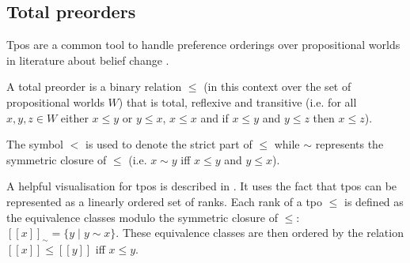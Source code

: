 \documentclass[english, 12pt]{scrartcl}
\theoremstyle{definition}
\theoremstyle{definition}
\theoremstyle{definition}
\begin{document}
\subsection{Total preorders}
Tpos are a common tool to handle preference orderings over propositional worlds in literature about belief change \cite{Booth2011}.

A total preorder is a binary relation $\leq$ (in this context over the set of propositional worlds $W$) that is total, reflexive and transitive (i.e. for all $x, y, z \in W$ either $x \leq y$ or $y \leq x$, $x \leq x$ and if $x \leq y$ and $y \leq z$ then $x \leq z$).

The symbol $<$ is used to denote the strict part of $\leq$ while $\sim$ represents the symmetric closure of $\leq$ (i.e. $x \sim y$ iff $x \leq y$ and $y \leq x$).

A helpful visualisation for tpos is described in \cite{Booth2006}. It uses the fact that tpos can be represented as a linearly ordered set of ranks. Each rank of a tpo $\leq$ is defined as the equivalence classes modulo the symmetric closure of $\leq$: $[[x]]_{\sim} = \{y \mid y \sim x\}$. These equivalence classes are then ordered by the relation $[[x]] \leq [[y]]$ iff $x \leq y$.
\end{document}
